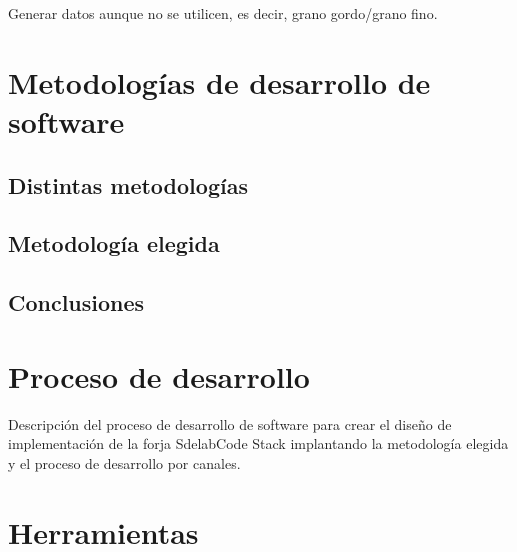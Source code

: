 \documentclass[11pt]{scrartcl}
\begin{document}
\par Generar datos aunque no se utilicen, es decir, grano gordo/grano fino.





\section{Metodologías de desarrollo de software}
\label{sec:metodologias}

\subsection{Distintas metodologías}
\label{sub:lista-metodologias}


\subsection{Metodología elegida}
\label{sub:metodologia-elegida}


\subsection{Conclusiones}
\label{sub:metodologia-conclusiones}



\section{Proceso de desarrollo}
\label{sec:procesodesarrollo}

\par Descripci\'on del proceso de desarrollo de software para crear el diseño de implementaci\'on de la forja SdelabCode Stack implantando la metodología elegida y el proceso de desarrollo por canales.

\section{Herramientas}
\label{sec:herramientas}
\end{document}
